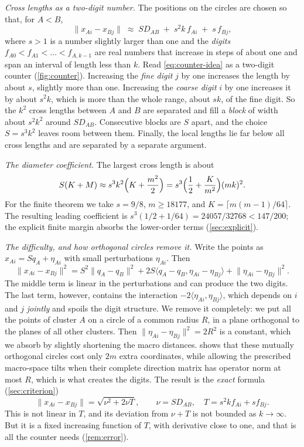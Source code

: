 \documentclass[11pt]{amsart}
\numberwithin{equation}{section}
\theoremstyle{definition}
\theoremstyle{remark}
\newcommand{\ip}[2]{\langle #1,#2\rangle}
\newcommand{\norm}[1]{\lVert #1\rVert}
\begin{document}
\emph{Cross lengths as a two-digit number.} The positions on the circles
are chosen so that, for $A<B$,
\begin{equation}\label{eq:counter-idea}
 \norm{x_{Ai}-x_{Bj}}\;\approx\;
 SD_{AB}\;+\;s^2k\,f_{Ai}\;+\;s\,f_{Bj},
\end{equation}
where $s>1$ is a number slightly larger than one and the \emph{digits}
$f_{A0}<f_{A1}<\dots<f_{A,k-1}$ are real numbers that increase in steps of
about one and span an interval of length less than $k$. Read
\eqref{eq:counter-idea} as a two-digit counter (\cref{fig:counter}).
Increasing the \emph{fine digit} $j$ by one increases the length by
about $s$, slightly more than one. Increasing the \emph{coarse digit} $i$ by one
increases it by about $s^2k$, which is more than the whole range, about
$sk$, of the fine digit. So the $k^2$ cross lengths between $A$ and $B$
are separated and fill a \emph{block} of width about $s^2k^2$ around
$SD_{AB}$. Consecutive blocks are $S$ apart, and the choice $S=s^3k^2$
leaves room between them. Finally, the local lengths lie far below all
cross lengths and are separated by a separate argument.

\emph{The diameter coefficient.} The largest cross length is about
\[
 S(K+M)\approx s^3k^2\Bigl(K+\frac{m^2}2\Bigr)
 =s^3\Bigl(\frac12+\frac K{m^2}\Bigr)(mk)^2.
\]
For the finite theorem we take $s=9/8$, $m\ge18177$, and
$K=\lceil m(m-1)/64\rceil$. The resulting leading coefficient is
$s^3(1/2+1/64)=24057/32768<147/200$; the explicit finite margin
absorbs the lower-order terms (\cref{sec:explicit}).

\emph{The difficulty, and how orthogonal circles remove it.} Write the
points as $x_{Ai}=Sq_A+\eta_{Ai}$ with small perturbations $\eta_{Ai}$.
Then
\[
 \norm{x_{Ai}-x_{Bj}}^2
 =S^2\norm{q_A-q_B}^2
  +2S\ip{q_A-q_B}{\eta_{Ai}-\eta_{Bj}}
  +\norm{\eta_{Ai}-\eta_{Bj}}^2.
\]
The middle term is linear in the perturbations and can produce the two
digits. The last term, however, contains the interaction
$-2\ip{\eta_{Ai}}{\eta_{Bj}}$, which depends on $i$ and $j$
\emph{jointly} and spoils the digit structure. We remove it completely:
we put all the points of cluster $A$ on a circle of a common radius $R$,
in a plane orthogonal to the planes of all other clusters. Then
$\norm{\eta_{Ai}-\eta_{Bj}}^2=2R^2$ is a constant, which we absorb by
slightly shortening the macro distances.  shows that
these mutually orthogonal circles cost only $2m$ extra coordinates, while
allowing the prescribed macro-space tilts when their complete direction
matrix has operator norm at most $R$, which is what creates the digits.
The result is the
\emph{exact} formula (\cref{sec:criterion})
\begin{equation}\label{eq:exact-idea}
 \norm{x_{Ai}-x_{Bj}}=\sqrt{\nu^2+2\nu T},
 \qquad \nu=SD_{AB},\quad T=s^2kf_{Ai}+sf_{Bj}.
\end{equation}
This is not linear in $T$, and its deviation from $\nu+T$ is not bounded
as $k\to\infty$. But it is a fixed increasing function of $T$, with
derivative close to one, and that is all the counter needs
(\cref{rem:error}).
\end{document}
